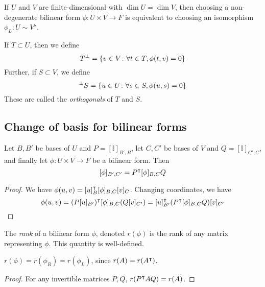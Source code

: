 \begin{corollary}
	If \( U \) and \( V \) are finite-dimensional with \( \dim U = \dim V \), then choosing a non-degenerate bilinear form \( \phi \colon U \times V \to F \) is equivalent to choosing an isomorphism \( \phi_L \colon U \sim V^\star \).
\end{corollary}
\begin{definition}
	If \( T \subset U \), then we define
	\[
		T^\perp = \qty{ v \in V \colon \forall t \in T, \phi(t,v) = 0 }
	\]
	Further, if \( S \subset V \), we define
	\[
		^\perp S = \qty{ u \in U \colon \forall s \in S, \phi(u,s) = 0 }
	\]
	These are called the \textit{orthogonals} of \( T \) and \( S \).
\end{definition}

\subsection{Change of basis for bilinear forms}
\begin{proposition}
	Let \( B, B' \) be bases of \( U \) and \( P = [\mathbb I]_{B', B} \), let \( C, C' \) be bases of \( V \) and \( Q = [\mathbb I]_{C', C} \), and finally let \( \phi \colon U \times V \to F \) be a bilinear form.
	Then
	\[
		[\phi]_{B', C'} = P^\intercal [\phi]_{B,C} Q
	\]
\end{proposition}
\begin{proof}
	We have \( \phi(u,v) = [u]_B^\intercal [\phi]_{B,C} [v]_C \).
	Changing coordinates, we have
	\[
		\phi(u,v) = (P [u]_{B'})^\intercal [\phi]_{B,C} (Q [v]_{C'}) = [u]_{B'}^\intercal (P^\intercal [\phi]_{B,C} Q) [v]_{C'}
	\]
\end{proof}
\begin{lemma}
	The \textit{rank} of a bilinear form \( \phi \), denoted \( r(\phi) \) is the rank of any matrix representing \( \phi \).
	This quantity is well-defined.
\end{lemma}
\begin{remark}
	\( r(\phi) = r(\phi_R) = r(\phi_L) \), since \( r(A) = r(A^\intercal) \).
\end{remark}
\begin{proof}
	For any invertible matrices \( P, Q \), \( r(P^\intercal A Q) = r(A) \).
\end{proof}
